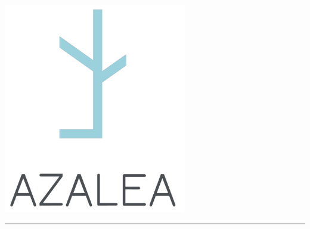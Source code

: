 \begin{titlepage}
    \centering
    \includegraphics[width=0.6\textwidth]{logos/LOGOAZALEA.png}\par\vspace{1cm}
    \begin{flushright}
        {\Large\bfseries\thetitle\par}
        \rule{1\textwidth}{1pt}\par
        {\color{gray}\Large\theauthor\par}
    \end{flushright}
    \vfill
    {\large\thedate\par}
\end{titlepage}